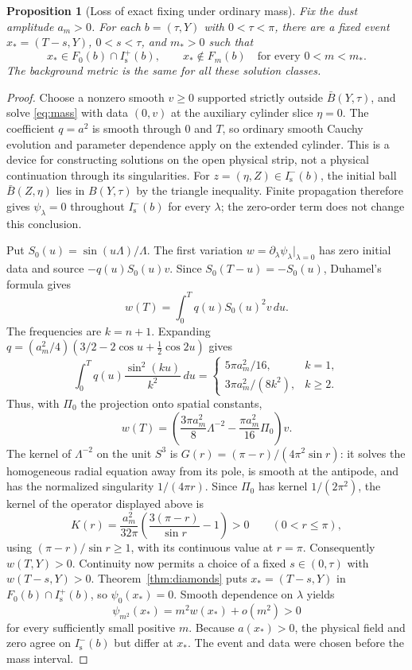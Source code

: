 \documentclass[11pt]{article}
\newtheorem{proposition}[theorem]{Proposition}
\theoremstyle{definition}
\newcommand{\Is}{I^-_{\mathrm s}}
\newcommand{\Isp}{I^+_{\mathrm s}}
\begin{document}
\begin{proposition}[Loss of exact fixing under ordinary mass]\label{prop:mass}
Fix the dust amplitude $a_m>0$. For each $b=(\tau,Y)$ with $0<\tau<\pi$,
there are a fixed event
$x_*=(T-s,Y)$, $0<s<\tau$, and $m_*>0$ such that
\[
 x_*\in F_0(b)\cap\Isp(b),\qquad
 x_*\notin F_m(b)\quad\text{for every }0<m<m_*.
\]
The background metric is the same for all these solution classes.
\end{proposition}

\begin{proof}
Choose a nonzero smooth $v\ge0$ supported strictly outside
$\bar B(Y,\tau)$, and solve \eqref{eq:mass} with data $(0,v)$ at the
auxiliary cylinder slice $\eta=0$. The coefficient $q=a^2$ is smooth through
$0$ and $T$, so ordinary smooth Cauchy evolution and parameter dependence
apply on the extended cylinder. This is a device for constructing solutions
on the open physical strip, not a physical continuation through its
singularities. For $z=(\eta,Z)\in\Is(b)$, the initial ball
$\bar B(Z,\eta)$ lies in $B(Y,\tau)$ by the triangle inequality. Finite
propagation therefore gives $\psi_\lambda=0$ throughout $\Is(b)$ for every
$\lambda$; the zero-order term does not change this conclusion.

Put $S_0(u)=\sin(u\Lambda)/\Lambda$. The first variation
$w=\partial_\lambda\psi_\lambda|_{\lambda=0}$ has zero initial data and source
$-q(u)S_0(u)v$. Since $S_0(T-u)=-S_0(u)$, Duhamel's formula gives
\[
 w(T)=\int_0^T q(u)S_0(u)^2v\,du.
\]
The frequencies are $k=n+1$. Expanding
$q=(a_m^2/4)(3/2-2\cos u+\tfrac12\cos2u)$ gives
\[
 \int_0^T q(u)\frac{\sin^2(ku)}{k^2}\,du
 =\begin{cases}5\pi a_m^2/16,&k=1,\\
                 3\pi a_m^2/(8k^2),&k\ge2.
   \end{cases}
\]
Thus, with $\Pi_0$ the projection onto spatial constants,
\[
 w(T)=\left(\frac{3\pi a_m^2}{8}\Lambda^{-2}
                -\frac{\pi a_m^2}{16}\Pi_0\right)v.
\]
The kernel of $\Lambda^{-2}$ on the unit $S^3$ is
$G(r)=(\pi-r)/(4\pi^2\sin r)$: it solves the homogeneous radial equation
away from its pole, is smooth at the antipode, and has the normalized
singularity $1/(4\pi r)$. Since $\Pi_0$ has kernel $1/(2\pi^2)$, the kernel
of the operator displayed above is
\[
 K(r)=\frac{a_m^2}{32\pi}
       \left(\frac{3(\pi-r)}{\sin r}-1\right)>0\qquad(0<r\le\pi),
\]
using $(\pi-r)/\sin r\ge1$, with its continuous value at $r=\pi$.
Consequently $w(T,Y)>0$. Continuity now permits a choice of a fixed
$s\in(0,\tau)$ with $w(T-s,Y)>0$. Theorem~\ref{thm:diamonds} puts
$x_*=(T-s,Y)$ in $F_0(b)\cap\Isp(b)$, so $\psi_0(x_*)=0$.
Smooth dependence on $\lambda$ yields
\[
 \psi_{m^2}(x_*)=m^2w(x_*)+o(m^2)>0
\]
for every sufficiently small positive $m$. Because $a(x_*)>0$, the physical
field and zero agree on $\Is(b)$ but differ at $x_*$. The event and data
were chosen before the mass interval.
\end{proof}
\end{document}
